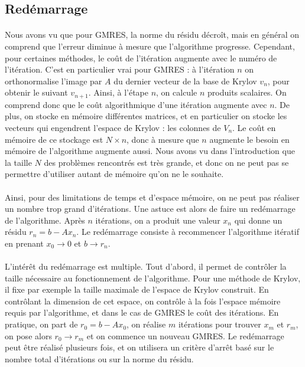 	\subsection{Redémarrage}

    \paragraph{}
    Nous avons vu que pour GMRES, la norme du résidu décroît, mais en général on comprend que l'erreur diminue à mesure que l'algorithme progresse.
    Cependant, pour certaines méthodes, le coût de l'itération augmente avec le numéro de l'itération.
    C'est en particulier vrai pour GMRES : à l'itération $n$ on orthonormalise l'image par $A$ du dernier vecteur de la base de Krylov $v_n$, pour obtenir le suivant $v_{n+1}$.
    Ainsi, à l'étape $n$, on calcule $n$ produits scalaires.
    On comprend donc que le coût algorithmique d'une itération augmente avec $n$.
    De plus, on stocke en mémoire différentes matrices, et en particulier on stocke les vecteurs qui engendrent l'espace de Krylov : les colonnes de $V_n$.
    Le coût en mémoire de ce stockage est $N\times n$, donc à mesure que $n$ augmente le besoin en mémoire de l'algorithme augmente aussi.
    Nous avons vu dans l'introduction que la taille $N$ des problèmes rencontrés est très grande, et donc on ne peut pas se permettre d'utiliser autant de mémoire qu'on ne le souhaite.

    \paragraph{}
    Ainsi, pour des limitations de temps et d'espace mémoire, on ne peut pas réaliser un nombre trop grand d'itérations.
    Une astuce est alors de faire un redémarrage de l'algorithme.
    Après $n$ itérations, on a produit une valeur $x_n$ qui donne un résidu $r_n = b - Ax_n$.
    Le redémarrage consiste à recommencer l'algorithme itératif en prenant $x_0\rightarrow 0$ et $b\rightarrow r_n$.

    \paragraph{}
    L'intérêt du redémarrage est multiple.
    Tout d'abord, il permet de contrôler la taille nécessaire au fonctionnement de l'algorithme.
    Pour une méthode de Krylov, il fixe par exemple la taille maximale de l'espace de Krylov construit.
    En contrôlant la dimension de cet espace, on contrôle à la fois l'espace mémoire requis par l'algorithme, et dans le cas de GMRES le coût des itérations.
    En pratique, on part de $r_0 = b - Ax_0$, on réalise $m$ itérations pour trouver $x_m$ et $r_m$, on pose alors $r_0 \rightarrow r_m$ et on commence un nouveau GMRES.
    Le redémarrage peut être réalisé plusieurs fois, et on utilisera un critère d'arrêt basé sur le nombre total d'itérations ou sur la norme du résidu.

